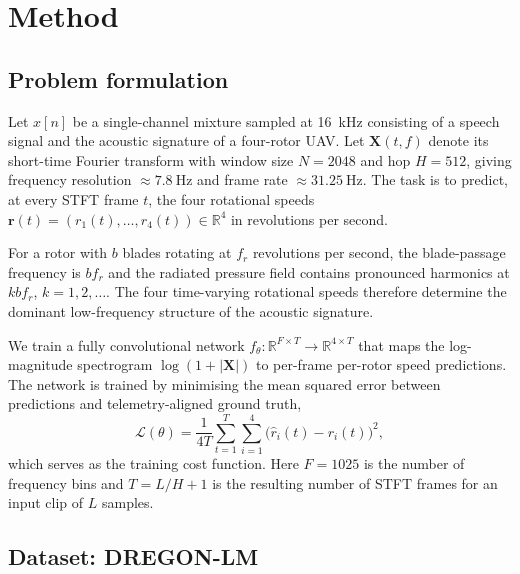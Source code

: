 \documentclass{QD_2026}
\begin{document}

\section{Method}
\label{sec:method}

\subsection{Problem formulation}

Let $x[n]$ be a single-channel mixture sampled at \SI{16}{\kilo\hertz} consisting of a
speech signal and the acoustic signature of a four-rotor UAV.
Let $\mathbf{X}(t, f)$ denote its short-time Fourier transform with window size
$N = 2048$ and hop $H = 512$, giving frequency resolution $\approx \SI{7.8}{\hertz}$ and
frame rate $\approx \SI{31.25}{\hertz}$.
The task is to predict, at every STFT frame $t$, the four rotational speeds
$\mathbf{r}(t) = (r_{1}(t), \dots, r_{4}(t)) \in \mathbb{R}^{4}$ in revolutions
per second.

For a rotor with $b$ blades rotating at $f_{r}$ revolutions per second, the
blade-passage frequency is $b f_{r}$ and the radiated pressure field contains
pronounced harmonics at $k b f_{r}$, $k = 1, 2, \dots$.
The four time-varying rotational speeds therefore determine the dominant
low-frequency structure of the acoustic signature.

We train a fully convolutional network $f_{\theta}: \mathbb{R}^{F \times T} \to \mathbb{R}^{4 \times T}$
that maps the log-magnitude spectrogram $\log(1 + |\mathbf{X}|)$ to per-frame per-rotor
speed predictions. The network is trained by minimising the mean squared error
between predictions and telemetry-aligned ground truth,
\begin{equation}
  \mathcal{L}(\theta)
    = \frac{1}{4T}\sum_{t=1}^{T}\sum_{i=1}^{4}
      \bigl(\hat{r}_{i}(t) - r_{i}(t)\bigr)^{2},
\end{equation}
which serves as the training cost function.
Here $F = 1025$ is the number of frequency bins and $T = L/H + 1$ is the
resulting number of STFT frames for an input clip of $L$ samples.

\subsection{Dataset: DREGON-LM}
\label{sec:dataset}
\end{document}
